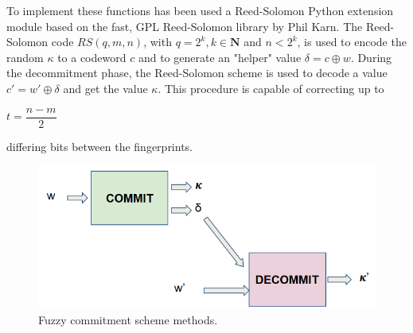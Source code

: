 To implement these functions has been used a Reed-Solomon Python extension module based on the fast, GPL Reed-Solomon library by Phil Karn.
The Reed-Solomon code $RS(q,m,n)$, with $q=2^k, k \in \mathbf{N} $ and $n <2^k$, is used to encode the random $\kappa$ to a codeword $c$ and to generate an "helper" value $\delta = c \oplus w$. 
During the decommitment phase, the Reed-Solomon scheme is used to decode a value $c' = w' \oplus \delta$ and get the value $\kappa$.
This procedure is capable of correcting up  to
\begin{center}
    $t = \dfrac{n - m }{2}$
\end{center}
differing  bits  between  the fingerprints.

\begin{figure}[!h]
\centering
\includegraphics[width=4.5in]{images/fuzzy.PNG}
\caption{Fuzzy commitment scheme methods. }
\label{fig_fuzzyCommit}
\end{figure}